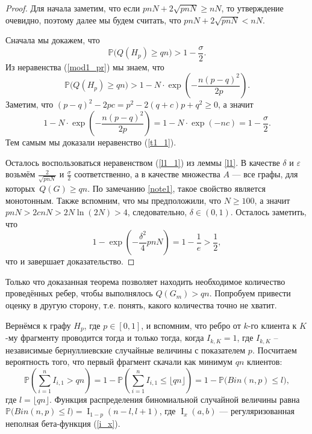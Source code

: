 \documentclass{matmex-diploma-custom}
\newcommand{\PRob}{\mathbb P}
\newcommand{\leqs}{\leqslant}
\newcommand{\geqs}{\geqslant}
\newcommand{\eps}{\varepsilon}
\DeclareMathOperator{\I}{I}
\theoremstyle{named}
\begin{document}
\begin{proof}
Для начала заметим, что если $pnN + 2\sqrt{pnN} \geqs nN$, то утверждение очевидно, 
поэтому далее мы будем считать, что $pnN + 2\sqrt{pnN} < nN$.

Сначала мы докажем, что 
\begin{equation}\label{t1_1}
\PRob\big(Q(H_p) \geqs qn \big) > 1 - \frac\sigma{2}.
\end{equation}
Из неравенства (\ref{mod1_pr}) мы знаем, что 
\begin{equation} \label{t1_t3_1}
\PRob\big(Q(H_p) \geqs qn \big) > 1 - N \cdot \exp\left(- \frac{n (p-q)^2}{2p} \right).
\end{equation}
Заметим, что $(p-q)^2 - 2pc = p^2 -2(q + c)p + q^2 \geqs 0$, а значит
\begin{equation}
1 - N \cdot \exp\left(- \frac{n (p-q)^2}{2p} \right) = 1 - N \cdot \exp(-nc) = 1 - \frac\sigma{2}.
\end{equation}
Тем самым мы доказали неравенство (\ref{t1_1}).

Осталось воспользоваться неравенством (\ref{l1_1}) из леммы \ref{l1}. 
В качестве $\delta$ и $\eps$ возьмём $\frac{2}{\sqrt{pnN}}$ и $\frac\sigma{2}$ соответственно, 
а в качестве множества $A$ --- все графы, для которых~$Q(G) \geqs qn$.
По замечанию \ref{note1}, такое свойство является монотонным.
Также вспомним, что мы предположили, что $N \geqs 100$, а значит $pnN > 2cnN> 2N\ln(2N) > 4$, 
следовательно, $\delta \in (0,1)$. 
Осталось заметить, что 
\begin{equation}
1 - \exp\left(-\frac{\delta^2}{4}pnN\right) = 1 - \frac{1}{e} > \frac{1}{2},
\end{equation}
что и завершает доказательство.
\end{proof}

\bigskip

Только что доказанная теорема позволяет находить необходимое количество проведённых ребер, чтобы выполнялось $Q(G_m) > qn$.
Попробуем привести оценку в другую сторону, т.е. понять, какого количества точно не хватит.

Вернёмся к графу $H_p$, где $p \in [0,1]$, и вспомним, что ребро от $k$-го клиента к $K$-му фрагменту 
проводится тогда и только тогда,
когда $I_{k,K} = 1$, где $I_{k,K}$ -- независимые бернуллиевские случайные величины с показателем $p$. 
Посчитаем вероятность того, что первый фрагмент скачали как минимум $qn$ клиентов:
\begin{equation}
\PRob\left(\sum_{i=1}^n I_{i,1} > qn\right) 
	= 
1 - \PRob\left(\sum_{i=1}^n I_{i,1} \leqs \lfloor qn \rfloor\right) 
	= 
1 - \PRob\big(Bin(n, p) \leqs l\big),
\end{equation}
где $l = \lfloor qn \rfloor$. Функция распределения биномиальной 
случайной величины равна $\PRob\big(Bin(n, p) \leqs l\big) = \I_{1-p}(n-l, l+1)$, 
где $\I_x(a,b)$ --- регуляризованная неполная бета-функция (\ref{i_x}).
\end{document}
